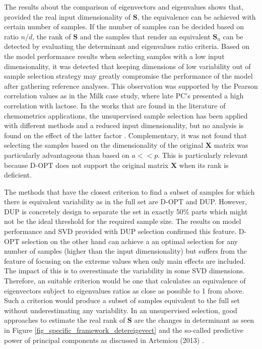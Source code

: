 \documentclass[journal=ancham,manuscript=article]{achemso}
\begin{document}
The results about the comparison of eigenvectors and eigenvalues shows that, provided the real input dimensionality of $\mathbf{S}$, the equivalence can be achieved with certain number of samples. If the number of samples can be decided based on ratio $n/d$, the rank of $\mathbf{S}$ and the samples that render an equivalent $\mathbf{S}_n$ can be detected by evaluating the determinant and eigenvalues ratio criteria. Based on the model performance results when selecting samples with a low input dimensionality, it was detected that keeping dimensions of low variability out of sample selection strategy may greatly compromise the performance of the model after gathering reference analyses. This observation was supported by the Pearson correlation values as in the Milk case study, where late PC's presented a high correlation with lactose. In the works that are found in the literature of chemometrics applications, the unsupervised sample selection has been applied with different methods and a reduced input dimensionality, but no analysis is found on the effect of the latter factor \cite{Naes1990, Brandmaier2012, Nawar2018, Au2020}. Complementary, it was not found that selecting the samples based on the dimensionality of the original $\mathbf{X}$ matrix was particularly advantageous than based on $a<<p$. This is particularly relevant because D-OPT does not support the original matrix $\mathbf{X}$ when its rank is deficient.

The methods that have the closest criterion to find a subset of samples for which there is equivalent variability as in the full set are D-OPT and DUP. However, DUP is concretely design to separate the set in exactly 50\% parts which might not be the ideal threshold for the required sample size. The results on model performance and SVD provided with DUP selection confirmed this feature. D-OPT selection on the other hand can achieve a an optimal selection for any number of samples (higher than the input dimensionality) but suffers from the feature of focusing on the extreme values when only main effects are included. The impact of this is to overestimate the variability in some SVD dimensions. Therefore, an suitable criterion would be one that calculates an equivalence of eigenvectors subject to eigenvalues ratios as close as possible to 1 from above. Such a criterion would produce a subset of samples equivalent to the full set without underestimating any variability. In an unsupervised selection, good approaches to estimate the real rank of $\mathbf{S}$ are the changes in determinant as seen in Figure \ref{fig_specific_framework_detereigevect} and the so-called predictive power of principal components as discussed in Artemiou (2013) \cite{Artemiou2013}. 
\end{document}
